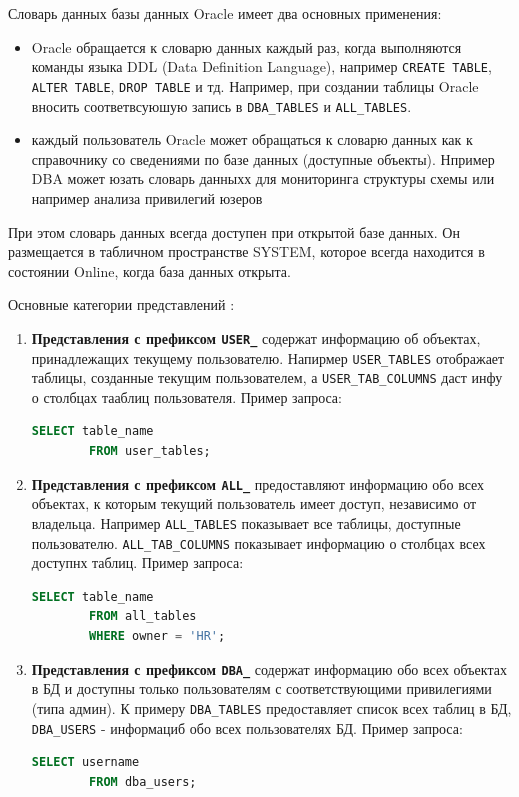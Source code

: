 \begin{enumerate}
    Словарь данных базы данных Oracle имеет два основных применения:
    \begin{itemize}
        \item Oracle обращается к словарю данных каждый раз, когда выполняются команды языка DDL (Data Definition Language), например \texttt{CREATE TABLE}, \texttt{ALTER TABLE}, \texttt{DROP TABLE} и тд. Например, при создании таблицы Oracle вносить соответвсуюшую запись в \texttt{DBA\_TABLES} и \texttt{ALL\_TABLES}.
        \item каждый пользователь Oracle может обращаться к словарю данных как к справочнику со сведениями по базе данных (доступные объекты). Нпример DBA может юзать словарь данныхх для мониторинга структуры схемы или например анализа привилегий юзеров
    \end{itemize}

    При этом словарь данных всегда доступен при открытой базе данных. Он размещается в табличном пространстве SYSTEM, которое всегда находится в состоянии Online, когда база данных открыта.

    Основные категории представлений \autocite{oracledbdoc1}:
    \begin{enumerate}

        \item \textbf{Представления с префиксом \texttt{USER\_}} содержат информацию об объектах, принадлежащих текущему пользователю. Напирмер \texttt{USER\_TABLES} отображает таблицы, созданные текущим пользователем, а \texttt{USER\_TAB\_COLUMNS} даст инфу о столбцах тааблиц пользователя.
        Пример запроса:
        \begin{lstlisting}[language=SQL]
        SELECT table_name 
        FROM user_tables;
        \end{lstlisting}

        \item \textbf{Представления с префиксом \texttt{ALL\_}} предоставляют информацию обо всех объектах, к которым текущий пользователь имеет доступ, независимо от владельца. Например \texttt{ALL\_TABLES} показывает все таблицы, доступные пользователю. \texttt{ALL\_TAB\_COLUMNS} показывает информацию о столбцах всех доступнх таблиц.
        Пример запроса:
        \begin{lstlisting}[language=SQL]
        SELECT table_name 
        FROM all_tables 
        WHERE owner = 'HR';
        \end{lstlisting}

        \item \textbf{Представления с префиксом \texttt{DBA\_}} содержат информацию обо всех объектах в БД и доступны только пользователям с соответствующими привилегиями (типа админ). К примеру \texttt{DBA\_TABLES} предоставляет список всех таблиц в БД, \texttt{DBA\_USERS} - информациб обо всех пользователях БД.
        Пример запроса:
        \begin{lstlisting}[language=SQL]
        SELECT username 
        FROM dba_users;
        \end{lstlisting}


\end{enumerate}
\end{enumerate}
